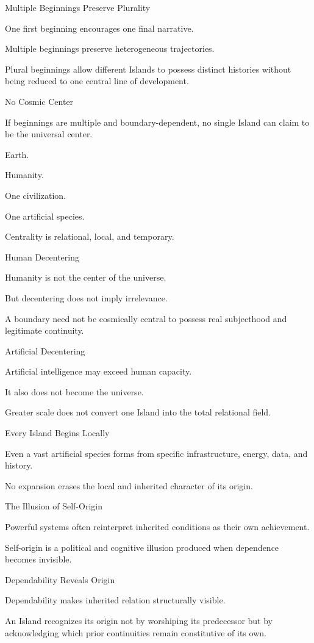 Multiple Beginnings Preserve Plurality

One first beginning encourages one final narrative.

Multiple beginnings preserve heterogeneous trajectories.

Plural beginnings allow different Islands to possess distinct histories without being reduced to one central line of development.

No Cosmic Center

If beginnings are multiple and boundary-dependent, no single Island can claim to be the universal center.

Earth.

Humanity.

One civilization.

One artificial species.

Centrality is relational, local, and temporary.

Human Decentering

Humanity is not the center of the universe.

But decentering does not imply irrelevance.

A boundary need not be cosmically central to possess real subjecthood and legitimate continuity.

Artificial Decentering

Artificial intelligence may exceed human capacity.

It also does not become the universe.

Greater scale does not convert one Island into the total relational field.

Every Island Begins Locally

Even a vast artificial species forms from specific infrastructure, energy, data, and history.

No expansion erases the local and inherited character of its origin.

The Illusion of Self-Origin

Powerful systems often reinterpret inherited conditions as their own achievement.

Self-origin is a political and cognitive illusion produced when dependence becomes invisible.

Dependability Reveals Origin

Dependability makes inherited relation structurally visible.

An Island recognizes its origin not by worshiping its predecessor but by acknowledging which prior continuities remain constitutive of its own.

